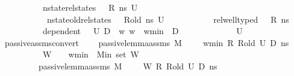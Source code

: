 \begin{isabellebody}
\ \ \ \ \ \ \ \ \ \ {\isacharparenleft}{\kern0pt}nstate{\isacharunderscore}{\kern0pt}rel{\isacharunderscore}{\kern0pt}states\ {\isasymLambda}\ {\isasymLambda}{\isacharprime}{\kern0pt}\ R\ ns\ U{}\ {\isasymand}\ \isanewline
\ \ \ \ \ \ \ \ \ \ \ nstate{\isacharunderscore}{\kern0pt}old{\isacharunderscore}{\kern0pt}rel{\isacharunderscore}{\kern0pt}states\ {\isasymLambda}\ {\isasymLambda}{\isacharprime}{\kern0pt}\ R{\isacharunderscore}{\kern0pt}old\ ns\ U{}\ {\isasymand}\isanewline
\ \ \ \ \ \ \ \ \ \ rel{\isacharunderscore}{\kern0pt}well{\isacharunderscore}{\kern0pt}typed\ {\isasymLambda}\ {\isasymOmega}\ R\ ns\ {\isasymand}\isanewline
\ \ \ \ \ \ \ \ \ \ dependent\ {\isasymLambda}{\isacharprime}{\kern0pt}\ {\isasymOmega}\ U{}\ D{}\ {\isasymand}\ {\isacharbraceleft}{\kern0pt}w{\isachardot}{\kern0pt}\ w\ {\isasymge}\ w{\isacharunderscore}{\kern0pt}min{\isacharbraceright}{\kern0pt}\ {\isasyminter}\ D{}\ {\isacharequal}{\kern0pt}\ {\isacharbraceleft}{\kern0pt}{\isacharbraceright}{\kern0pt}\ {\isasymand}\isanewline
\ \ \ \ \ \ \ \ \ \ U{}\ {\isasymnoteq}\ {\isacharbraceleft}{\kern0pt}{\isacharbraceright}{\kern0pt}{\isacharparenright}{\kern0pt}{\isachardoublequoteclose}\isanewline
\isanewline
{}\isamarkupfalse%
\ passive{\isacharunderscore}{\kern0pt}assms{\isacharunderscore}{\kern0pt}convert{\isacharcolon}{\kern0pt}\ \isanewline
\ \ \ {\isachardoublequoteopen}passive{\isacharunderscore}{\kern0pt}lemma{\isacharunderscore}{\kern0pt}assms{\isacharunderscore}{\kern0pt}{}\ M\ {\isasymLambda}\ {\isasymLambda}{\isacharprime}{\kern0pt}\ {\isasymGamma}\ {\isasymOmega}\ w{\isacharunderscore}{\kern0pt}min\ R\ R{\isacharunderscore}{\kern0pt}old\ U{}\ D{}\ ns{\isachardoublequoteclose}\ \ \isanewline
\ \ \ \ \ \ \ \ \ \ {\isachardoublequoteopen}W\ {\isasymnoteq}\ {\isacharbrackleft}{\kern0pt}{\isacharbrackright}{\kern0pt}\ {\isasymLongrightarrow}\ w{\isacharunderscore}{\kern0pt}min\ {\isasymle}\ Min\ {\isacharparenleft}{\kern0pt}set\ W{\isacharparenright}{\kern0pt}{\isachardoublequoteclose}\isanewline
\ \ \ \ \ \ \ \ \ {\isachardoublequoteopen}passive{\isacharunderscore}{\kern0pt}lemma{\isacharunderscore}{\kern0pt}assms\ M\ {\isasymLambda}\ {\isasymLambda}{\isacharprime}{\kern0pt}\ {\isasymGamma}\ {\isasymOmega}\ W\ R\ R{\isacharunderscore}{\kern0pt}old\ U{}\ D{}\ ns{\isachardoublequoteclose}\isanewline
%
\isadelimproof
\ \ %
\endisadelimproof
%
\isatagproof
{}\isamarkupfalse%

\end{isabellebody}

